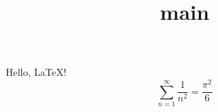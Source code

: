 \renewcommand\normalsize{\fontsize{10pt}{12pt}\selectfont}
\title{main}
\setlength\hoffset{-1in}
\setlength\voffset{-1in}
\setlength\oddsidemargin{0pt}
\setlength\topmargin{0pt}
\setlength\headheight{0pt}
\setlength\headsep{0pt}
\setlength\textheight{20mm}
\setlength\pageheight{\textheight}
\setlength\textwidth{40mm}
\setlength\pagewidth{\textwidth}
\setlength\parindent{0mm}


Hello, \LaTeX!
$$\sum_{n = 1}^\infty\frac1{n^2} = \frac{\pi^2}{6}$$


